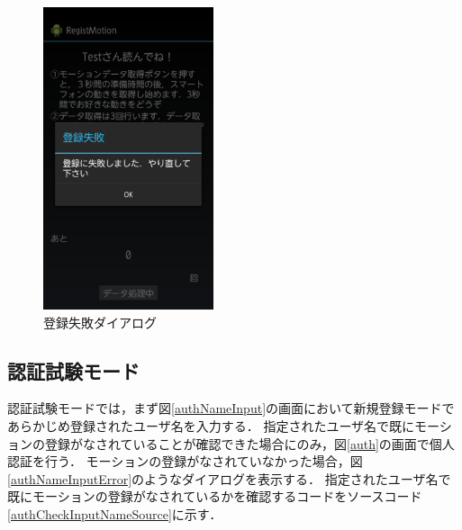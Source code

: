 \documentclass[11pt]{jreport}
\begin{document}
\begin{figure}[bthp]
\begin{minipage}{0.33\hsize}
            \end{minipage}
            \begin{minipage}{0.33\hsize}
                \begin{center}
                    \includegraphics[width=5cm, bb=0 0 540 960]{RegFail.pdf}
                \end{center}
                \caption{登録失敗ダイアログ}
                \label{regFail}
            \end{minipage}
        \end{figure}

        \subsection{認証試験モード}
        認証試験モードでは，まず図\ref{authNameInput}の画面において新規登録モードであらかじめ登録されたユーザ名を入力する．
        指定されたユーザ名で既にモーションの登録がなされていることが確認できた場合にのみ，図\ref{auth}の画面で個人認証を行う．
        モーションの登録がなされていなかった場合，図\ref{authNameInputError}のようなダイアログを表示する．
        指定されたユーザ名で既にモーションの登録がなされているかを確認するコードをソースコード\ref{authCheckInputNameSource}に示す．
\end{document}
